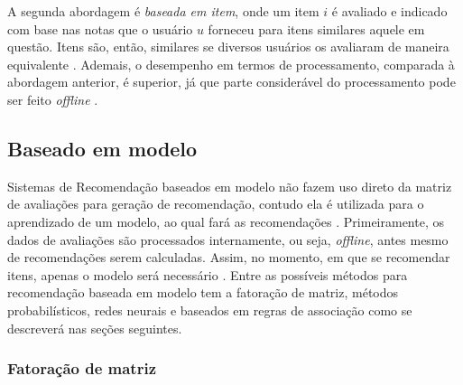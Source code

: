             A segunda abordagem é \textit{baseada em item}, onde um item $i$ é avaliado e indicado com base nas notas que o usuário $u$ forneceu para itens similares aquele em questão. Itens são, então, similares se diversos usuários os avaliaram de maneira equivalente \cite{Ricci2010}. Ademais, o desempenho em termos de processamento, comparada à abordagem anterior, é superior, já que parte considerável do processamento pode ser feito \textit{offline} \cite{Jannach2010, Miranda2010}.
            
                        
    
    
    \subsection{Baseado em modelo}

        Sistemas de Recomendação baseados em modelo  não fazem uso direto da matriz de avaliações para geração de recomendação, contudo ela é utilizada para o aprendizado de um modelo, ao qual fará as recomendações \cite{Adomavicius2005}. Primeiramente, os dados de avaliações são processados internamente, ou seja, \textit{offline}, antes mesmo de  recomendações serem calculadas. Assim, no momento, em que se recomendar itens, apenas o modelo será necessário \cite{Jannach2010}. Entre as possíveis métodos para recomendação baseada em modelo tem a fatoração de matriz, métodos probabilísticos, redes neurais e baseados em regras de associação como se descreverá nas seções seguintes. 
        
        \subsubsection{Fatoração de matriz}
        
